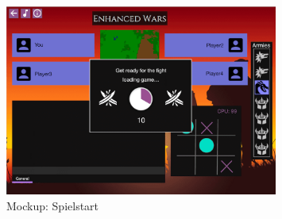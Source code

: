 \documentclass[12pt, titlepage]{scrartcl}
\begin{document}
			    \begin{figure}[H] 
    				\centering
    				\includegraphics[width=0.8\textwidth]{images/mockups/StartGame.png}
    				\caption{Mockup: Spielstart}
    				\label{Game_Start}
			    \end{figure}
\end{document}
